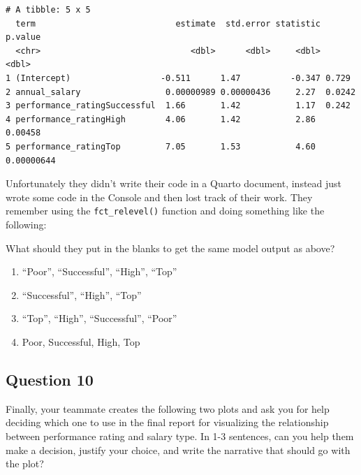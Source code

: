 \documentclass[
  letterpaper,
  DIV=11,
  numbers=noendperiod]{scrartcl}
\providecommand{\tightlist}{%
  \setlength{\itemsep}{0pt}\setlength{\parskip}{0pt}}\usepackage{longtable,booktabs,array}
\begin{document}
\begin{verbatim}
# A tibble: 5 x 5
  term                            estimate  std.error statistic    p.value
  <chr>                              <dbl>      <dbl>     <dbl>      <dbl>
1 (Intercept)                  -0.511      1.47          -0.347 0.729     
2 annual_salary                 0.00000989 0.00000436     2.27  0.0242    
3 performance_ratingSuccessful  1.66       1.42           1.17  0.242     
4 performance_ratingHigh        4.06       1.42           2.86  0.00458   
5 performance_ratingTop         7.05       1.53           4.60  0.00000644
\end{verbatim}

Unfortunately they didn't write their code in a Quarto document, instead
just wrote some code in the Console and then lost track of their work.
They remember using the \texttt{fct\_relevel()} function and doing
something like the following:

What should they put in the blanks to get the same model output as
above?

\begin{enumerate}
\def\labelenumi{\alph{enumi}.}
\tightlist
\item
  ``Poor'', ``Successful'', ``High'', ``Top''
\item
  ``Successful'', ``High'', ``Top''
\item
  ``Top'', ``High'', ``Successful'', ``Poor''
\item
  Poor, Successful, High, Top
\end{enumerate}

\newpage{}

\hypertarget{question-10}{%
\subsection{Question 10}\label{question-10}}

Finally, your teammate creates the following two plots and ask you for
help deciding which one to use in the final report for visualizing the
relationship between performance rating and salary type. In 1-3
sentences, can you help them make a decision, justify your choice, and
write the narrative that should go with the plot?
\end{document}
